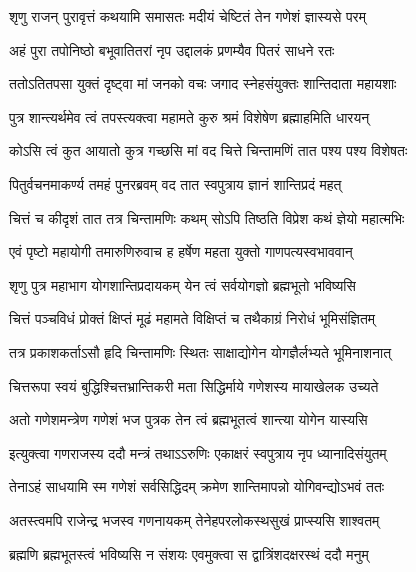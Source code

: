 
\twolineshloka
{श‍ृणु राजन् पुरावृत्तं कथयामि समासतः}
{मदीयं चेष्टितं तेन गणेशं ज्ञास्यसे परम्} %

\twolineshloka
{अहं पुरा तपोनिष्ठो बभूवातितरां नृप}
{उद्दालकं प्रणम्यैव पितरं साधने रतः} %

\twolineshloka
{ततोऽतितपसा युक्तं दृष्ट्वा मां जनको वचः}
{जगाद स्नेहसंयुक्तः शान्तिदाता महायशाः} %


\twolineshloka
{पुत्र शान्त्यर्थमेव त्वं तपस्त्यक्त्वा महामते}
{कुरु श्रमं विशेषेण ब्रह्माहमिति धारयन्} %

\twolineshloka
{कोऽसि त्वं कुत आयातो कुत्र गच्छसि मां वद}
{चित्ते चिन्तामणिं तात पश्य पश्य विशेषतः} %

\twolineshloka
{पितुर्वचनमाकर्ण्य तमहं पुनरब्रवम्}
{वद तात स्वपुत्राय ज्ञानं शान्तिप्रदं महत्} %

\twolineshloka
{चित्तं च कीदृशं तात तत्र चिन्तामणिः कथम्}
{सोऽपि तिष्ठति विप्रेश कथं ज्ञेयो महात्मभिः} %


\twolineshloka
{एवं पृष्टो महायोगी तमारुणिरुवाच ह}
{हर्षेण महता युक्तो गाणपत्यस्वभाववान्} %


\twolineshloka
{श‍ृणु पुत्र महाभाग योगशान्तिप्रदायकम्}
{येन त्वं सर्वयोगज्ञो ब्रह्मभूतो भविष्यसि} %

\twolineshloka
{चित्तं पञ्चविधं प्रोक्तं क्षिप्तं मूढं महामते}
{विक्षिप्तं च तथैकाग्रं निरोधं भूमिसंज्ञितम्} %

\twolineshloka
{तत्र प्रकाशकर्ताऽसौ हृदि चिन्तामणिः स्थितः}
{साक्षाद्योगेन योगज्ञैर्लभ्यते भूमिनाशनात्} %

\twolineshloka
{चित्तरूपा स्वयं बुद्धिश्चित्तभ्रान्तिकरी मता}
{सिद्धिर्माये गणेशस्य मायाखेलक उच्यते} %

\twolineshloka
{अतो गणेशमन्त्रेण गणेशं भज पुत्रक}
{तेन त्वं ब्रह्मभूतत्वं शान्त्या योगेन यास्यसि} %

\twolineshloka
{इत्युक्त्वा गणराजस्य ददौ मन्त्रं तथाऽऽरुणिः}
{एकाक्षरं स्वपुत्राय नृप ध्यानादिसंयुतम्} %

\twolineshloka
{तेनाऽहं साधयामि स्म गणेशं सर्वसिद्धिदम्}
{क्रमेण शान्तिमापन्नो योगिवन्द्योऽभवं ततः} %

\twolineshloka
{अतस्त्वमपि राजेन्द्र भजस्व गणनायकम्}
{तेनेहपरलोकस्थसुखं प्राप्स्यसि शाश्वतम्} %

\twolineshloka
{ब्रह्मणि ब्रह्मभूतस्त्वं भविष्यसि न संशयः}
{एवमुक्त्वा स द्वात्रिंशदक्षरस्थं ददौ मनुम्} %

